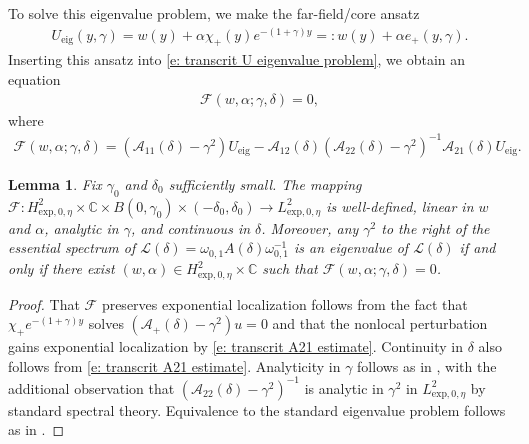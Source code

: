 \documentclass[11pt]{article}
\newcommand{\C}{\mathbb{C}}
\newcommand{\mcl}{\mathcal{L}}
\newtheorem{lemma}[prop]{Lemma}
\numberwithin{equation}{section}
\numberwithin{prop}{section}
\begin{document}
To solve this eigenvalue problem, we make the far-field/core ansatz
\begin{align}
	U_\mathrm{eig}(y, \gamma) = w(y) + \alpha \chi_+ (y) e^{-(1+\gamma) y} =: w(y) + \alpha e_+(y, \gamma).
\end{align}
Inserting this ansatz into \eqref{e: transcrit U eigenvalue problem}, we obtain an equation
\begin{align}
	\mathcal{F}(w, \alpha; \gamma, \delta) = 0,
\end{align}
where
\begin{align}
	\mathcal{F}(w, \alpha; \gamma, \delta) = (\mathcal{A}_{11}(\delta) - \gamma^2) U_\mathrm{eig} - \mathcal{A}_{12}(\delta) (\mathcal{A}_{22}(\delta) - \gamma^2)^{-1} \mathcal{A}_{21}(\delta) U_\mathrm{eig}. 
\end{align}
\begin{lemma}\label{l: transcrit evans fcn regularity}
	Fix $\gamma_0$ and $\delta_0$ sufficiently small. The mapping $\mathcal{F}: H^2_{\mathrm{exp}, 0, \eta} \times \C \times B(0,\gamma_0) \times (-\delta_0, \delta_0) \to L^2_{\mathrm{exp}, 0, \eta}$ is well-defined, linear in $w$ and $\alpha$, analytic in $\gamma$, and continuous in $\delta$. Moreover, any $\gamma^2$ to the right of the essential spectrum of $\mcl(\delta) = \omega_{0,1} A(\delta) \omega_{0,1}^{-1}$ is an eigenvalue of $\mcl(\delta)$ if and only if there exist $(w, \alpha) \in H^2_{\mathrm{exp}, 0, \eta} \times \C$ such that $\mathcal{F}(w, \alpha; \gamma, \delta) = 0$. 
\end{lemma}
\begin{proof}
	That $\mathcal{F}$ preserves exponential localization follows from the fact that $\chi_+ e^{-(1+\gamma)y}$ solves $(\mathcal{A}_+(\delta) - \gamma^2) u = 0$ and that the nonlocal perturbation gains exponential localization by \eqref{e: transcrit A21 estimate}. Continuity in $\delta$ also follows from \eqref{e: transcrit A21 estimate}. Analyticity in $\gamma$ follows as in \cite[Proposition 5.11]{PoganScheel}, with the additional observation that $(\mathcal{A}_{22}(\delta) - \gamma^2)^{-1}$ is analytic in $\gamma^2$ in $L^2_{\mathrm{exp}, 0, \eta}$ by standard spectral theory. Equivalence to the standard eigenvalue problem follows as in \cite[proof of Proposition 5.11, step 6]{PoganScheel}. 
\end{proof}
\end{document}
